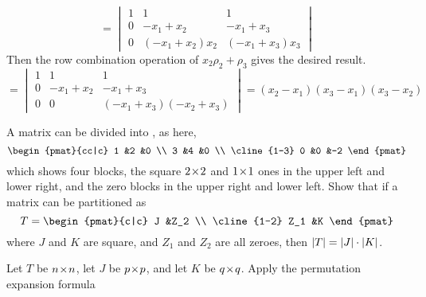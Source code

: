 \begin{exercises}
\begin{answer}
\begin{equation*}
        =
        \begin{vmatrix}
          1     &1             &1             \\
          0     &-x_1+x_2      &-x_1+x_3      \\
          0     &(-x_1+x_2)x_2 &(-x_1+x_3)x_3 
        \end{vmatrix}
      \end{equation*}
      Then the row combination operation of $x_2\rho_2+\rho_3$ gives
      the desired result.
      \begin{equation*}
        =
        \begin{vmatrix}
          1     &1             &1                     \\
          0     &-x_1+x_2      &-x_1+x_3              \\
          0     &0             &(-x_1+x_3)(-x_2+x_3) 
        \end{vmatrix}
        =(x_2-x_1)(x_3-x_1)(x_3-x_2)
      \end{equation*}
    \end{answer}
  \item 
    A matrix can be divided into  
    , %
    as here,
    \begin{equation*} 
      \begin{pmat}{cc|c}
          1  &2   &0  \\
          3  &4   &0  \\  \cline{1-3}
          0  &0   &-2 
       \end{pmat}
    \end{equation*}
    which shows four blocks, the square $2 \! \times \! 2$ and $1 \! \times \! 1$ ones
    in the upper left and lower right, and the zero blocks in the
    upper right and lower left.
    Show that if a matrix can be partitioned as
    \begin{equation*}
      T=
      \begin{pmat}{c|c}
          J   &Z_2  \\  \cline{1-2}
          Z_1 &K
       \end{pmat}
    \end{equation*}
    where $J$ and $K$ are square, and $Z_1$ and $Z_2$ are all zeroes,
    then \( \deter{T}=\deter{J}\cdot\deter{K} \).
    \begin{answer}
      Let \( T \) be \( n \! \times \! n \),
      let \( J \) be \( p \! \times \! p \),
      and let \( K \) be \( q \! \times \! q \).
      Apply the permutation expansion formula
      \begin{equation*}

\end{equation*}
\end{answer}
\end{exercises}
